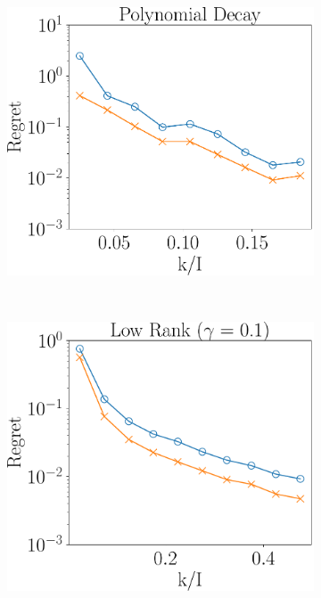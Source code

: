 \begin{figure}
	\begin{subfigure}{0.3\textwidth}
		\includegraphics[scale = 0.25]{figure/fig3_spd_200.pdf}
	\end{subfigure}\\
	\begin{subfigure}{0.3\textwidth}
		\includegraphics[scale = 0.25]{figure/fig3_lk_mnoise_200.pdf}
	\end{subfigure}
	\begin{subfigure}{0.55\textwidth}

\end{subfigure}
\end{figure}

